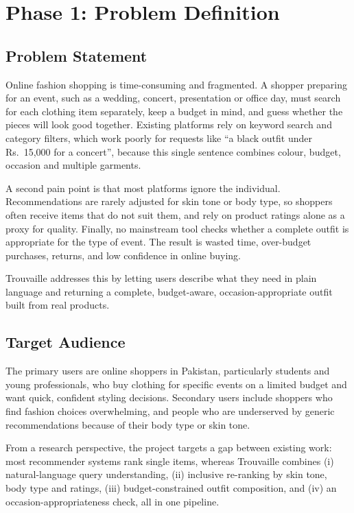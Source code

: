 \section{Phase 1: Problem Definition}

\subsection{Problem Statement}
Online fashion shopping is time-consuming and fragmented. A shopper preparing for an event, such as a wedding, concert, presentation or office day, must search for each clothing item separately, keep a budget in mind, and guess whether the pieces will look good together. Existing platforms rely on keyword search and category filters, which work poorly for requests like ``a black outfit under Rs.\ 15,000 for a concert'', because this single sentence combines colour, budget, occasion and multiple garments.

A second pain point is that most platforms ignore the individual. Recommendations are rarely adjusted for skin tone or body type, so shoppers often receive items that do not suit them, and rely on product ratings alone as a proxy for quality. Finally, no mainstream tool checks whether a complete outfit is appropriate for the type of event. The result is wasted time, over-budget purchases, returns, and low confidence in online buying.

Trouvaille addresses this by letting users describe what they need in plain language and returning a complete, budget-aware, occasion-appropriate outfit built from real products.

\subsection{Target Audience}
The primary users are online shoppers in Pakistan, particularly students and young professionals, who buy clothing for specific events on a limited budget and want quick, confident styling decisions. Secondary users include shoppers who find fashion choices overwhelming, and people who are underserved by generic recommendations because of their body type or skin tone.

From a research perspective, the project targets a gap between existing work: most recommender systems rank single items, whereas Trouvaille combines (i) natural-language query understanding, (ii) inclusive re-ranking by skin tone, body type and ratings, (iii) budget-constrained outfit composition, and (iv) an occasion-appropriateness check, all in one pipeline.

